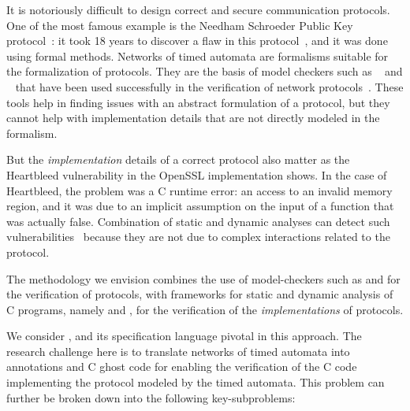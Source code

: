 It is notoriously difficult to design correct and secure communication
protocols. One of the most famous example is the Needham Schroeder
Public Key protocol~\cite{NS1978:CACM}: it took 18 years to discover a
flaw in this protocol~\cite{LOW1996:TACAS}, and it was done using
formal methods.  Networks of timed automata are formalisms suitable
for the formalization of protocols.  They are the basis of model
checkers such as \uppaal~\cite{DLL2015:STTT} and
\prism~\cite{KNP2011:CAV} that have been used successfully in the
verification of network
protocols~\cite{ZBW2013:ENTCS,HMJ2006:MASCOTS,HSS2010:NFM,KPK2015:VECOS}.
These tools help in finding issues with an abstract formulation of a
protocol, but they cannot help with implementation details that are
not directly modeled in the formalism.

But the {\em implementation} details of a correct protocol also matter
as the Heartbleed vulnerability in the OpenSSL implementation
shows. In the case of Heartbleed, the problem was a C runtime error:
an access to an invalid memory region, and it was due to an implicit
assumption on the input of a function that was actually false.
Combination of static and dynamic analyses can detect such
vulnerabilities~\cite{KKP2015:HVC} because they are not due to complex
interactions related to the protocol. 

The methodology we envision combines the use of model-checkers such as
\uppaal and \prism for the verification of protocols, with frameworks
for static and dynamic analysis of C programs, namely \framac and
\deepstate, for the verification of the {\em implementations} of
protocols.

We consider \framac, and its specification language \acsl pivotal in this
approach. The research challenge here is to translate networks of
timed automata into \acsl annotations and C ghost code for enabling
the verification of the C code implementing the protocol modeled by
the timed automata. This problem can further be broken down into the
following key-subproblems:

